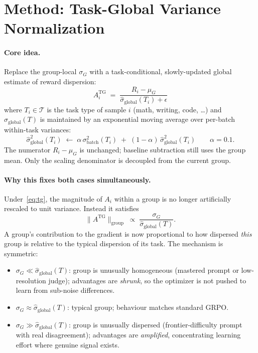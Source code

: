 \documentclass[10pt]{article}
\begin{document}
\section{Method: Task-Global Variance Normalization}

\paragraph{Core idea.}
Replace the group-local $\sigma_G$ with a task-conditional, slowly-updated global
estimate of reward dispersion:
\begin{equation}
A_i^{\text{TG}} \;=\; \frac{R_i - \mu_G}{\hat{\sigma}_{\text{global}}(T_i) + \epsilon}
\label{eq:tg}
\end{equation}
where $T_i \in \mathcal{T}$ is the task type of sample $i$ (math, writing, code,
\ldots) and $\hat{\sigma}_{\text{global}}(T)$ is maintained by an exponential
moving average over per-batch within-task variances:
\begin{equation}
\hat{\sigma}^2_{\text{global}}(T_i) \;\leftarrow\; \alpha\,\sigma^2_{\text{batch}}(T_i)
\;+\; (1-\alpha)\,\hat{\sigma}^2_{\text{global}}(T_i)
\qquad \alpha = 0.1.
\label{eq:ema}
\end{equation}
The numerator $R_i - \mu_G$ is unchanged; baseline subtraction still uses the
group mean. Only the scaling denominator is decoupled from the current group.

\paragraph{Why this fixes both cases simultaneously.}
Under~\eqref{eq:tg}, the magnitude of $A_i$ within a group is no longer
artificially rescaled to unit variance. Instead it satisfies
\begin{equation}
\|A^{\text{TG}}\|_{\text{group}}
\;\propto\;
\frac{\sigma_G}{\hat{\sigma}_{\text{global}}(T)}.
\label{eq:budget}
\end{equation}
A group's contribution to the gradient is now proportional to how dispersed
\emph{this} group is relative to the typical dispersion of its task. The
mechanism is symmetric:

\begin{itemize}\itemsep2pt
\item $\sigma_G \ll \hat{\sigma}_{\text{global}}(T)$: group is unusually
homogeneous (mastered prompt or low-resolution judge); advantages are
\emph{shrunk}, so the optimizer is not pushed to learn from sub-noise
differences.
\item $\sigma_G \approx \hat{\sigma}_{\text{global}}(T)$: typical group;
behaviour matches standard GRPO.
\item $\sigma_G \gg \hat{\sigma}_{\text{global}}(T)$: group is unusually
dispersed (frontier-difficulty prompt with real disagreement); advantages are
\emph{amplified}, concentrating learning effort where genuine signal exists.
\end{itemize}
\end{document}

